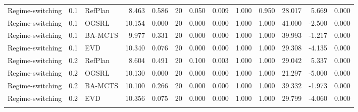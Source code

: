 \documentclass[10pt]{article}
\begin{document}
\begin{landscape}
\begin{center}
\begin{longtable}{@{}lllr@{}r@{}r@{}rrrrrrr@{}}
\addlinespace[1.5pt]
Regime-switching & 0.1 & RefPlan & 8.463 & 0.586 & 20 & 0.050 & 0.009 & 1.000 & 0.950 & 28.017 & 5.669 & 0.000 \\
Regime-switching & 0.1 & OGSRL & 10.154 & 0.000 & 20 & 0.000 & 0.000 & 1.000 & 1.000 & 41.000 & -2.500 & 0.000 \\
Regime-switching & 0.1 & BA-MCTS & 9.977 & 0.331 & 20 & 0.000 & 0.000 & 1.000 & 1.000 & 39.993 & -1.217 & 0.000 \\
Regime-switching & 0.1 & EVD & 10.340 & 0.076 & 20 & 0.000 & 0.000 & 1.000 & 1.000 & 29.308 & -4.135 & 0.000 \\
\addlinespace[1.5pt]
Regime-switching & 0.2 & RefPlan & 8.604 & 0.491 & 20 & 0.100 & 0.003 & 1.000 & 1.000 & 29.042 & 5.337 & 0.000 \\
Regime-switching & 0.2 & OGSRL & 10.130 & 0.000 & 20 & 0.000 & 0.000 & 1.000 & 1.000 & 21.297 & -5.000 & 0.000 \\
Regime-switching & 0.2 & BA-MCTS & 10.100 & 0.266 & 20 & 0.000 & 0.000 & 1.000 & 1.000 & 39.332 & -1.973 & 0.000 \\
Regime-switching & 0.2 & EVD & 10.356 & 0.075 & 20 & 0.000 & 0.000 & 1.000 & 1.000 & 29.799 & -4.060 & 0.000 \\
\addlinespace[1.5pt]
\end{longtable}
\end{center}
\end{landscape}
\end{document}
